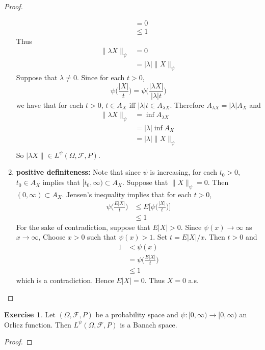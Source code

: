\documentclass[12pt]{amsart}
\theoremstyle{definition}
\newtheorem{ex}[definition]{Exercise}
\newcommand{\lam}{\lambda}
\newcommand{\Om}{\Omega}
\newcommand{\MF}{\mathcal{F}}
\newcommand{\Rg}{[0,\infty)}
\begin{document}
\begin{proof}
\begin{enumerate}
\begin{align*}
				& = 0 \\
				& \leq 1
			\end{align*}
			Thus
			\begin{align*}
				\|\lam X\|_{\psi} 
				& = 0 \\
				& = |\lam|\|X\|_{\psi}
			\end{align*}
			Suppose that $\lam \neq 0$. Since for each $t > 0$,
			$$\psi \bigg( \frac{|X|}{t} \bigg) = \psi \bigg( \frac{|\lam X|}{|\lam| t} \bigg)$$ 
			we have that for each $t > 0$, $t \in A_{X}$ iff $|\lam| t \in A_{\lam X}$. Therefore $A_{\lam X} = |\lam| A_{X}$ and 
			\begin{align*}
				\|\lam X\|_{\psi} 
				& = \inf A_{\lam X} \\
				& = |\lam| \inf A_X \\
				& = |\lam| \|X\|_{\psi} \\
			\end{align*}  
			So $|\lam X\| \in L^{\psi}(\Om, \MF, P)$.
 			\item \textbf{positive definiteness:} 
			Note that since $\psi$ is increasing, for each $t_0 >0$, $t_0 \in A_X$ implies that $[t_0, \infty) \subset A_X$. Suppose that $\|X\|_{\psi} = 0$. Then $(0, \infty) \subset A_X$. Jensen's inequality implies that for each $t > 0$,
			\begin{align*}
				\psi \bigg( \frac{E|X|}{t} \bigg) 
				& \leq E \bigg[\psi \bigg( \frac{|X|}{t} \bigg) \bigg] \\
				& \leq 1 
			\end{align*} 
			For the sake of contradiction, suppose that $E|X| > 0$. Since $\psi(x) \rightarrow \infty$ as $x \rightarrow \infty$, Choose $x > 0$ such that $\psi(x) > 1$. Set $t = E|X| /x$. Then $t > 0$ and 
			\begin{align*}
				1 
				& < \psi(x) \\
				& = \psi \bigg( \frac{E|X|}{t} \bigg) \\
				& \leq 1
			\end{align*}
			which is a contradiction. Hence $E|X| = 0$. Thus $X = 0$ a.s.  
		\end{enumerate}
	\end{proof}
	
	
	\begin{ex}
			Let $(\Om, \MF, P)$ be a probability space and $\psi: \Rg \rightarrow \Rg$ an Orlicz function. Then $L^{\psi}(\Om, \MF, P)$ is a Banach space.
	\end{ex}

	\begin{proof}
		
	\end{proof}
	
\end{document}
